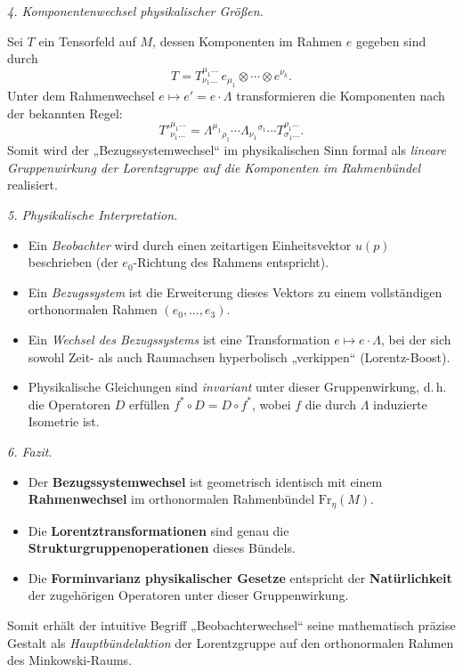 \documentclass[10pt, letterpaper]{article}
\begin{document}
\bigskip
\emph{4. Komponentenwechsel physikalischer Größen.}

Sei $T$ ein Tensorfeld auf $M$, dessen Komponenten im Rahmen $e$ gegeben sind durch
\[
T = T^{\mu_1\ldots}_{\nu_1\ldots}\, e_{\mu_1}\otimes\cdots\otimes e^{\nu_k}.
\]
Unter dem Rahmenwechsel $e\mapsto e'=e\cdot\Lambda$ transformieren die Komponenten
nach der bekannten Regel:
\[
T'^{\mu_1\ldots}_{\nu_1\ldots}
= 
\Lambda^{\mu_1}{}_{\rho_1}\cdots
\Lambda_{\nu_1}{}^{\sigma_1}\cdots
T^{\rho_1\ldots}_{\sigma_1\ldots}.
\]
Somit wird der „Bezugssystemwechsel“ im physikalischen Sinn formal als 
\emph{lineare Gruppenwirkung der Lorentzgruppe auf die Komponenten im Rahmenbündel}
realisiert.

\bigskip
\emph{5. Physikalische Interpretation.}

\begin{itemize}
  \item Ein \emph{Beobachter} wird durch einen zeitartigen Einheitsvektor $u(p)$
  beschrieben (der $e_0$-Richtung des Rahmens entspricht).
  \item Ein \emph{Bezugssystem} ist die Erweiterung dieses Vektors zu einem
  vollständigen orthonormalen Rahmen $(e_0,\ldots,e_3)$.
  \item Ein \emph{Wechsel des Bezugssystems} ist eine Transformation 
  $e\mapsto e\cdot\Lambda$, bei der sich sowohl Zeit- als auch Raumachsen
  hyperbolisch „verkippen“ (Lorentz-Boost).
  \item Physikalische Gleichungen sind \emph{invariant} unter dieser Gruppenwirkung,
  d.\,h. die Operatoren $D$ erfüllen $f^*\circ D = D\circ f^*$, 
  wobei $f$ die durch $\Lambda$ induzierte Isometrie ist.
\end{itemize}

\bigskip
\emph{6. Fazit.}
\begin{itemize}
  \item Der \textbf{Bezugssystemwechsel} ist geometrisch identisch mit einem
  \textbf{Rahmenwechsel} im orthonormalen Rahmenbündel $\mathrm{Fr}_\eta(M)$.
  \item Die \textbf{Lorentztransformationen} sind genau die 
  \textbf{Strukturgruppenoperationen} dieses Bündels.
  \item Die \textbf{Forminvarianz physikalischer Gesetze} 
  entspricht der \textbf{Natürlichkeit} der zugehörigen Operatoren unter dieser Gruppenwirkung.
\end{itemize}

Somit erhält der intuitive Begriff „Beobachterwechsel“ seine mathematisch präzise 
Gestalt als \emph{Hauptbündelaktion} der Lorentzgruppe auf den orthonormalen Rahmen 
des Minkowski-Raums.
\end{document}
